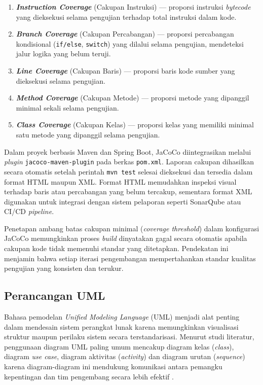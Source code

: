 \begin{enumerate}[noitemsep]
	\item \textbf{\textit{Instruction Coverage}} (Cakupan Instruksi) --- proporsi instruksi \textit{bytecode} yang dieksekusi selama pengujian terhadap total instruksi dalam kode.
	\item \textbf{\textit{Branch Coverage}} (Cakupan Percabangan) --- proporsi percabangan kondisional (\texttt{if/else}, \texttt{switch}) yang dilalui selama pengujian, mendeteksi jalur logika yang belum teruji.
	\item \textbf{\textit{Line Coverage}} (Cakupan Baris) --- proporsi baris kode sumber yang dieksekusi selama pengujian.
	\item \textbf{\textit{Method Coverage}} (Cakupan Metode) --- proporsi metode yang dipanggil minimal sekali selama pengujian.
	\item \textbf{\textit{Class Coverage}} (Cakupan Kelas) --- proporsi kelas yang memiliki minimal satu metode yang dipanggil selama pengujian.
\end{enumerate}

Dalam proyek berbasis Maven dan Spring Boot, JaCoCo diintegrasikan melalui \textit{plugin} \texttt{jacoco-maven-plugin} pada berkas \texttt{pom.xml}. Laporan cakupan dihasilkan secara otomatis setelah perintah \texttt{mvn test} selesai dieksekusi dan tersedia dalam format HTML maupun XML. Format HTML memudahkan inspeksi visual terhadap baris atau percabangan yang belum tercakup, sementara format XML digunakan untuk integrasi dengan sistem pelaporan seperti SonarQube atau CI/CD \textit{pipeline}.\par

Penetapan ambang batas cakupan minimal (\textit{coverage threshold}) dalam konfigurasi JaCoCo memungkinkan proses \textit{build} dinyatakan gagal secara otomatis apabila cakupan kode tidak memenuhi standar yang ditetapkan. Pendekatan ini menjamin bahwa setiap iterasi pengembangan mempertahankan standar kualitas pengujian yang konsisten dan terukur.\par

\subsection{Perancangan UML} \label{II.UML}
Bahasa pemodelan \textit{Unified Modeling Language} (UML) menjadi alat penting dalam mendesain sistem perangkat lunak karena memungkinkan visualisasi struktur maupun perilaku sistem secara terstandarisasi. Menurut studi literatur, penggunaan diagram UML paling umum mencakup diagram kelas (\textit{class}), diagram \textit{use case}, diagram aktivitas (\textit{activity}) dan diagram urutan (\textit{sequence}) karena diagram-diagram ini mendukung komunikasi antara pemangku kepentingan dan tim pengembang secara lebih efektif \cite{koc2021uml}.\par

